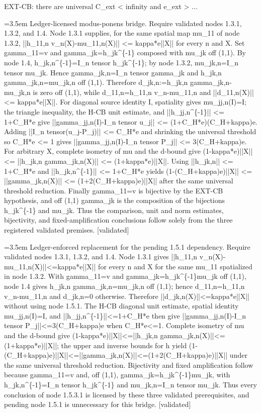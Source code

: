 \documentclass{article}
\newcommand{\step}[1]{\par\noindent\hangindent=3.5em\hangafter=1%
  \makebox[3.5em][l]{\textbf{#1.}}}
\newcommand{\steptag}[1]{\hfill{\small\textsf{[#1]}}}
\begin{document}
\begin{proofbox}{EXT-CB: there are universal C\_ext < infinity and e\_ext > ...}
\step{1.5.3.1.2.1} Ledger-licensed modus-ponens bridge. Require validated nodes 1.3.1, 1.3.2, and 1.4. Node 1.3.1 supplies, for the same spatial map mu\_11 of node 1.3.2, ||h\_11,n v\_n(X)-mu\_11,n(X)|| <= kappa*e||X|| for every n and X. Set gamma\_11=v and gamma\_jk=h\_jk\textasciicircum{}\{-1\} composed with mu\_jk off (1,1). By node 1.4, h\_jk,n\textasciicircum{}\{-1\}=I\_n tensor h\_jk\textasciicircum{}\{-1\}; by node 1.3.2, mu\_jk,n=I\_n tensor mu\_jk. Hence gamma\_jk,n=I\_n tensor gamma\_jk and h\_jk,n gamma\_jk,n=mu\_jk,n off (1,1). Therefore d\_jk,n:=h\_jk,n gamma\_jk,n-mu\_jk,n is zero off (1,1), while d\_11,n=h\_11,n v\_n-mu\_11,n and ||d\_11,n(X)|| <= kappa*e||X||. For diagonal source identity I, spatiality gives mu\_jj,n(I)=I; the triangle inequality, the H-CB unit estimate, and ||h\_jj,n\textasciicircum{}\{-1\}|| <= 1+C\_H*e give ||gamma\_jj,n(I)-I\_n tensor u\_j|| <= (1+C\_H*e)(C\_H+kappa)e. Adding ||I\_n tensor(u\_j-P\_j)|| <= C\_H*e and shrinking the universal threshold so C\_H*e <= 1 gives ||gamma\_jj,n(I)-I\_n tensor P\_j|| <= 3(C\_H+kappa)e. For arbitrary X, complete isometry of mu and the d-bound give (1-kappa*e)||X|| <= ||h\_jk,n gamma\_jk,n(X)|| <= (1+kappa*e)||X||. Using ||h\_jk,n|| <= 1+C\_H*e and ||h\_jk,n\textasciicircum{}\{-1\}|| <= 1+C\_H*e yields (1-(C\_H+kappa)e)||X|| <= ||gamma\_jk,n(X)|| <= (1+2(C\_H+kappa)e)||X|| after the same universal threshold reduction. Finally gamma\_11=v is bijective by the EXT-CB hypothesis, and off (1,1) gamma\_jk is the composition of the bijections h\_jk\textasciicircum{}\{-1\} and mu\_jk. Thus the comparison, unit and norm estimates, bijectivity, and fixed-amplification conclusions follow solely from the three registered validated premises. \steptag{validated} \\[4pt]
\step{1.5.3.1.3} Ledger-enforced replacement for the pending 1.5.1 dependency. Require validated nodes 1.3.1, 1.3.2, and 1.4. Node 1.3.1 gives ||h\_11,n v\_n(X)-mu\_11,n(X)||<=kappa*e||X|| for every n and X for the same mu\_11 spatialized in node 1.3.2. With gamma\_11=v and gamma\_jk=h\_jk\textasciicircum{}\{-1\}mu\_jk off (1,1), node 1.4 gives h\_jk,n gamma\_jk,n=mu\_jk,n off (1,1); hence d\_11,n=h\_11,n v\_n-mu\_11,n and d\_jk,n=0 otherwise. Therefore ||d\_jk,n(X)||<=kappa*e||X|| without using node 1.5.1. The H-CB diagonal unit estimate, spatial identity mu\_jj,n(I)=I, and ||h\_jj,n\textasciicircum{}\{-1\}||<=1+C\_H*e then give ||gamma\_jj,n(I)-I\_n tensor P\_j||<=3(C\_H+kappa)e when C\_H*e<=1. Complete isometry of mu and the d-bound give (1-kappa*e)||X||<=||h\_jk,n gamma\_jk,n(X)||<=(1+kappa*e)||X||; the upper and inverse bounds for h yield (1-(C\_H+kappa)e)||X||<=||gamma\_jk,n(X)||<=(1+2(C\_H+kappa)e)||X|| under the same universal threshold reduction. Bijectivity and fixed amplification follow because gamma\_11=v and, off (1,1), gamma\_jk=h\_jk\textasciicircum{}\{-1\}mu\_jk, with h\_jk,n\textasciicircum{}\{-1\}=I\_n tensor h\_jk\textasciicircum{}\{-1\} and mu\_jk,n=I\_n tensor mu\_jk. Thus every conclusion of node 1.5.3.1 is licensed by these three validated prerequisites, and pending node 1.5.1 is unnecessary for this bridge. \steptag{validated} \\[4pt]

\end{proofbox}
\end{document}
